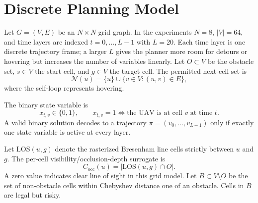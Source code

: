 \documentclass[10pt,conference]{IEEEtran}
\begin{document}
\section{Discrete Planning Model}
Let $G=(V,E)$ be an $N\times N$ grid graph. In the experiments $N=8$, $|V|=64$, and time layers are indexed $t=0,\ldots,L-1$ with $L=20$. Each time layer is one discrete trajectory frame; a larger $L$ gives the planner more room for detours or hovering but increases the number of variables linearly. Let $O\subset V$ be the obstacle set, $s\in V$ the start cell, and $g\in V$ the target cell. The permitted next-cell set is
\begin{equation}
\mathcal{N}(u)=\{u\}\cup\{v\in V:(u,v)\in E\},
\end{equation}
where the self-loop represents hovering.

The binary state variable is
\begin{equation}
 x_{t,v}\in\{0,1\},\qquad x_{t,v}=1 \Leftrightarrow \text{the UAV is at cell }v\text{ at time }t.
\end{equation}
A valid binary solution decodes to a trajectory $\pi=(v_0,\ldots,v_{L-1})$ only if exactly one state variable is active at every layer.

Let $\mathrm{LOS}(u,g)$ denote the rasterized Bresenham line cells strictly between $u$ and $g$. The per-cell visibility/occlusion-depth surrogate is
\begin{equation}
 C_{\mathrm{occ}}(u)=|\mathrm{LOS}(u,g)\cap O|.
\end{equation}
A zero value indicates clear line of sight in this grid model. Let $B\subset V\setminus O$ be the set of non-obstacle cells within Chebyshev distance one of an obstacle. Cells in $B$ are legal but risky.
\end{document}
